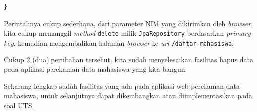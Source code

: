 \begin{enumerate}
\begin{lstlisting}
}
	\end{lstlisting}
	
	Perintahnya cukup sederhana, dari parameter NIM yang dikirimkan oleh \textit{browser}, kita cukup memanggil \textit{method} \texttt{delete} milik \texttt{JpaRepository} berdasarkan \textit{primary key}, kemudian mengembalikan halaman \textit{browser} ke \textit{url} \texttt{/daftar-mahasiswa}.
\end{enumerate}

Cukup 2 (dua) perubahan tersebut, kita sudah menyelesaikan fasilitas hapus data pada aplikasi perekaman data mahasiswa yang kita bangun.

Sekarang lengkap sudah fasilitas yang ada pada aplikasi web perekaman data mahasiswa, untuk selanjutnya dapat dikembangkan atau diimplementasikan pada soal UTS.